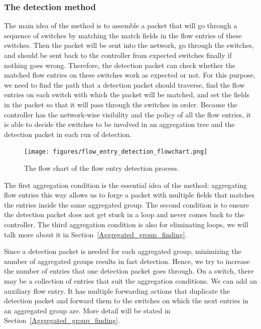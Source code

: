 \documentclass[conference]{IEEEtran}
\begin{document}
\subsubsection{The detection method}
\label{Detection_method}

The main idea of the method is to assemble a packet that will go through a sequence of switches by matching the match fields in the flow entries of these switches. Then the packet will be sent into the network, go through the switches, and should be sent back to the controller from expected switches finally if nothing goes wrong. Therefore, the detection packet can check whether the matched flow entries on these switches work as expected or not. For this purpose, we need to find the path that a detection packet should traverse, find the flow entries on each switch with which the packet will be matched, and set the fields in the packet so that it will pass through the switches in order. Because the controller has the network-wise visibility and the policy of all the flow entries, it is able to decide the switches to be involved in an aggregation tree and the detection packet in each run of detection. 

\begin{figure}[ht]
\centering
\texttt{[image: figures/flow\_entry\_detection\_flowchart.png]}
\caption{The flow chart of the flow entry detection process.}
\label{flow_entry_detection_flowchart}
\end{figure}

The first aggregation condition is the essential idea of the method: aggregating flow entries this way allows us to forge a packet with multiple fields that matches the entries inside the same aggregated group. The second condition is to ensure the detection packet does not get stuck in a loop and never comes back to the controller. The third aggregation condition is also for eliminating loops, we will talk more about it in Section~\ref{Aggregated_group_finding}.

Since a detection packet is needed for each aggregated group, minimizing the number of aggregated groups results in fast detection. Hence, we try to increase the number of entries that one detection packet goes through. On a switch, there may be a collection of entries that suit the aggregation conditions. We can add an auxiliary flow entry. It has multiple forwarding actions that duplicate the detection packet and forward them to the switches on which the next entries in an aggregated group are. More detail will be stated in Section~\ref{Aggregated_group_finding}.
\end{document}
